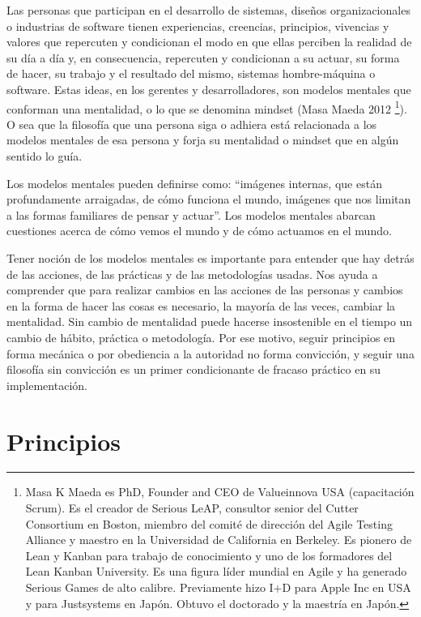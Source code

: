 Las personas que participan en el desarrollo de sistemas, diseños organizacionales o industrias de software tienen experiencias, creencias, principios, vivencias y valores que repercuten y condicionan el modo en que ellas perciben la realidad de su día a día y, en consecuencia, repercuten y condicionan a su actuar, su forma de hacer, su trabajo y el resultado del mismo, sistemas hombre-máquina o software. Estas ideas, en los gerentes y desarrolladores, son modelos mentales que conforman una mentalidad, o lo que se denomina mindset (Masa Maeda 2012 \footnote{Masa K Maeda es PhD, Founder and CEO de Valueinnova USA (capacitación Scrum). Es el creador de Serious LeAP, consultor senior del Cutter Consortium en Boston, miembro del comité de dirección del Agile Testing Alliance y maestro en la Universidad de California en Berkeley. Es pionero de Lean y Kanban para trabajo de conocimiento y uno de los formadores del Lean Kanban University. Es una figura líder mundial en Agile y ha generado Serious Games de alto calibre. Previamente hizo I+D para Apple Inc en USA y para Justsystems en Japón. Obtuvo el doctorado y la maestría en Japón.}). O sea que la filosofía que una persona siga o adhiera está relacionada a los modelos mentales de esa persona y forja su mentalidad o mindset que en algún sentido lo guía.

Los modelos mentales pueden definirse como: “imágenes internas, que están profundamente arraigadas, de cómo funciona el mundo, imágenes que nos limitan a las formas familiares de pensar y actuar”. Los modelos mentales abarcan cuestiones acerca de cómo vemos el mundo y de cómo actuamos en el mundo. 

Tener noción de los modelos mentales es importante para entender que hay detrás de las acciones, de las prácticas y de las metodologías usadas. Nos ayuda a comprender que para realizar cambios en las acciones de las personas y cambios en la forma de hacer las cosas es necesario, la mayoría de las veces, cambiar la mentalidad. Sin cambio de mentalidad puede hacerse insostenible en el tiempo un cambio de hábito, práctica o metodología. Por ese motivo, seguir principios en forma mecánica o por obediencia a la autoridad no forma convicción, y seguir una filosofía sin convicción es un primer condicionante de fracaso práctico en su implementación.

\section{Principios}

